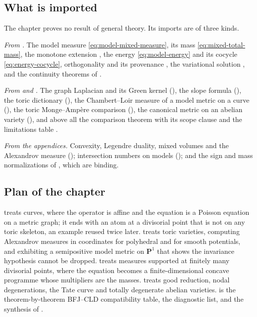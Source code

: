 \subsection{What is imported}
\label{sec:ch31-imported}

The chapter proves no result of general theory.  Its imports are of three
kinds.

\emph{From .}  The model measure
\eqref{eq:model-mixed-measure}, its mass \eqref{eq:mixed-total-mass}, the
monotone extension , the energy
\eqref{eq:model-energy} and its cocycle \eqref{eq:energy-cocycle},
orthogonality  and its provenance
, the variational solution
, and the continuity theorems of
.

\emph{From  and .}  The graph Laplacian and
its Green kernel (), the slope formula
(), the toric dictionary
(), the Chambert--Loir measure of a model metric on a
curve (), the toric Monge--Amp\`ere
comparison (), the canonical metric on an abelian
variety (), and above all the comparison theorem
 with its scope clause and the limitations
table .

\emph{From the appendices.}  Convexity, Legendre duality, mixed volumes and
the Alexandrov measure (); intersection numbers on
models (); and the sign and mass
normalizations of , which are binding.

\subsection{Plan of the chapter}
\label{sec:ch31-plan}

 treats curves, where the operator is affine and the
equation is a Poisson equation on a metric graph; it ends with an atom at a
divisorial point that is not on any toric skeleton, an example reused twice
later.   treats toric varieties, computing Alexandrov
measures in coordinates for polyhedral and for smooth potentials, and
exhibiting a semipositive model metric on \(\mathbf P^1\) that shows the
invariance hypothesis cannot be dropped.   treats
measures supported at finitely many divisorial points, where the equation
becomes a finite-dimensional concave programme whose multipliers are the
masses.   treats good reduction, nodal
degenerations, the Tate curve and totally degenerate abelian varieties.
 is the theorem-by-theorem BFJ--CLD compatibility
table,  the diagnostic list, and
 the synthesis of .

